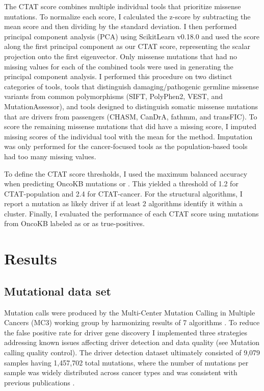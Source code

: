 The CTAT score combines multiple individual tools that prioritize missense mutations. To normalize each score, I calculated the z-score by subtracting the mean score and then dividing by the standard deviation. I then performed principal component analysis (PCA) using ScikitLearn v0.18.0 and used the score along the first principal component as our CTAT score, representing the scalar projection onto the first eigenvector. Only missense mutations that had no missing values for each of the combined tools were used in generating the principal component analysis. I performed this procedure on two distinct categories of tools,  tools that distinguish damaging/pathogenic germline missense variants from common polymorphisms (SIFT, PolyPhen2, VEST, and MutationAssessor), and  tools designed to distinguish somatic missense mutations that are drivers from passengers (CHASM, CanDrA, fathmm, and transFIC). To score the remaining missense mutations that did have a missing score, I imputed missing scores of the individual tool with the mean for the method. Imputation was only performed for the cancer-focused tools as the population-based tools had too many missing values.

To define the CTAT score thresholds, I used the maximum balanced accuracy when predicting OncoKB mutations  or . This yielded a threshold of 1.2 for CTAT-population and 2.4 for CTAT-cancer. For the structural algorithms, I report a mutation as likely driver if at least 2 algorithms identify it within a cluster. Finally, I evaluated the performance of each CTAT score using mutations from OncoKB labeled as  or  as true-positives.

\section{Results}
\subsection{Mutational data set}
Mutation calls were produced by the Multi-Center Mutation Calling in Multiple Cancers (MC3) working group by harmonizing results of 7 algorithms \cite{RN167}. To reduce the false positive rate for driver gene discovery I implemented three strategies addressing known issues affecting driver detection and data quality (see Mutation calling quality control). The driver detection dataset ultimately consisted of 9,079 samples having 1,457,702 total mutations, where the number of mutations per sample was widely distributed across cancer types and was consistent with previous publications \cite{RN12, RN13, RN96}.

